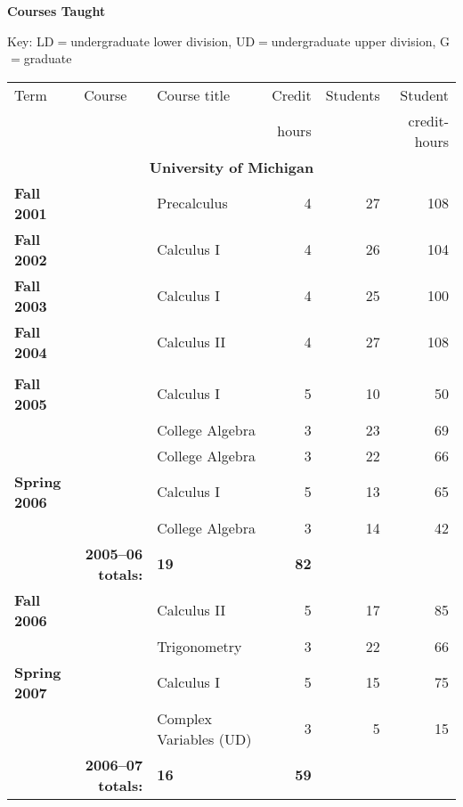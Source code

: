 \documentclass[12pt]{article}
\begin{document}

{\small

\textbf{Courses Taught}

Key: LD$=$undergraduate lower division, UD$=$undergraduate upper division, G$=$graduate

\begin{center}
\begin{longtable}{@{} l l l rrr @{}}
\toprule
Term & Course & Course title & Credit & Students & Student \\
     &        &              & hours  &          & credit-hours \\
\midrule

\multicolumn{6}{c}{\textbf{University of Michigan}} \\
\addlinespace[0.1in]
\textbf{Fall 2001} & & Precalculus & 4 & 27 & 108 \\
\addlinespace[0.1in]
\textbf{Fall 2002} & & Calculus I & 4 & 26 & 104 \\
\addlinespace[0.1in]
\textbf{Fall 2003} & & Calculus I & 4 & 25 & 100 \\
\addlinespace[0.1in]
\textbf{Fall 2004} & & Calculus II & 4 & 27 & 108 \\
\addlinespace[0.1in]

\midrule

\multicolumn{6}{c}{\textbf{Southeastern Louisiana University}} \\
\addlinespace[0.1in]

\textbf{Fall 2005} & & Calculus I & 5 & 10 & 50 \\
 & & College Algebra & 3 & 23 & 69 \\
 & & College Algebra & 3 & 22 & 66 \\
\addlinespace[0.1in]

\textbf{Spring 2006} & & Calculus I & 5 & 13 & 65 \\
 & & College Algebra & 3 & 14 & 42 \\
 \cmidrule{2-4}
 & \multicolumn{1}{r}{\textbf{2005--06 totals:}} & \textbf{19} & \textbf{82} \\
 \cmidrule{2-4}


\textbf{Fall 2006} & & Calculus II & 5 & 17 & 85 \\
 & & Trigonometry & 3 & 22 & 66 \\
\addlinespace[0.1in]

\textbf{Spring 2007} & & Calculus I & 5 & 15 & 75 \\
 & & Complex Variables (UD) & 3 & 5 & 15 \\
 \cmidrule{2-4}
 & \multicolumn{1}{r}{\textbf{2006--07 totals:}} & \textbf{16} & \textbf{59} \\


\end{longtable}
\end{center}}
\end{document}
